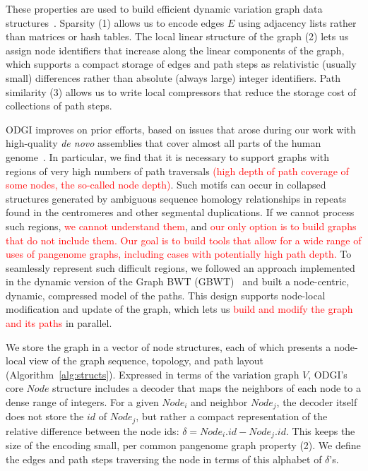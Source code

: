 \documentclass{bioinfo}
\newcommand{\red}[1]{{\textcolor{Red}{#1}}}
\newcommand{\FIXME}[1]{\red{[FIXME: #1]}}
\newcommand{\REVIEWED}[1]{{\textcolor{Red}{#1}}}
\begin{document}
These properties are used to build efficient dynamic variation graph data structures~\citep{Siren:2020,Eizenga_2020_BX}.
Sparsity (1) allows us to encode edges $E$ using adjacency lists rather than matrices or hash tables.
The local linear structure of the graph (2) lets us assign node identifiers that increase along the linear components of the graph, which supports a compact storage of edges and path steps as relativistic (usually small) differences rather than absolute (always large) integer identifiers.
Path similarity (3) allows us to write local compressors that reduce the storage cost of collections of path steps.

ODGI improves on prior efforts, based on issues that arose during our work with high-quality \textit{de novo} assemblies that cover almost all parts of the human genome~\citep{Logsdon_2021,Nurk_2021}.
In particular, we find that it is necessary to support graphs with regions of very high numbers of path traversals \REVIEWED{(high depth of path coverage of some nodes, the so-called node depth)}.
Such motifs can occur in collapsed structures generated by ambiguous sequence homology relationships in repeats found in the centromeres and other segmental duplications.
If we cannot process such regions, \REVIEWED{we cannot understand them}, and \REVIEWED{our only option is to build graphs that do not include them.}
\REVIEWED{Our goal is to build tools that allow for a wide range of uses of pangenome graphs, including cases with potentially high path depth.}
To seamlessly represent such difficult regions, we followed an approach implemented in the dynamic version of the Graph BWT (GBWT)~\citep{Siren:2020} and built a node-centric, dynamic, compressed model of the paths.
This design supports node-local modification and update of the graph, which lets us \REVIEWED{build and modify the graph and its paths} in parallel.

We store the graph in a vector of node structures, each of which presents a node-local view of the graph sequence, topology, and path layout (Algorithm~\ref{alg:structs}).
Expressed in terms of the variation graph $V$, ODGI's core $Node$ structure includes a decoder that maps the neighbors of each node to a dense range of integers.
For a given $Node_i$ and neighbor $Node_j$, the decoder itself does not store the $id$ of $Node_j$, but rather a compact representation of the relative difference between the node ids: $\delta = Node_i.id - Node_j.id$.
This keeps the size of the encoding small, per common pangenome graph property (2).
We define the edges and path steps traversing the node in terms of this alphabet of $\delta$'s.
\end{document}
